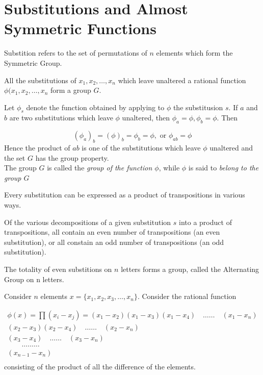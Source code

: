 \section{Substitutions and Almost Symmetric Functions}

Substition refers to the set of permutations of $n$ elements which form the Symmetric Group.

\begin{theorem}
All the substitutions of $x_1, x_2, \hdots, x_n$ which leave unaltered a rational function
$\phi(x_1, x_2,\hdots, x_n$ form a group $G$.
\end{theorem}

Let $\phi_s$ denote the function obtained by applying to $\phi$ the substitusion $s$. If $a$ and $b$
are two substitutions which leave $\phi$ unaltered, then $\phi_a = \phi, \phi_b = \phi$. Then

\[ (\phi_a)_b = (\phi)_b = \phi_b = \phi, \mbox{ or } \phi_{ab} = \phi \]
Hence the product of $ab$ is one of the substitutions which leave $\phi$ unaltered and the set
$G$ has the group property. \\

The group $G$ is called the {\it group of the function $\phi$}, while $\phi$ is said to {\it belong to the
group $G$}\\

\begin{theorem}
Every substitution can be expressed as a product of transpositions in various ways.
\end{theorem}

\begin{theorem}
Of the various decompositions of a given substitution $s$ into a product of transpositions, all contain
an even number of transpositions (an even substitution), or all constain an odd number of transpositions
(an odd substitution).
\end{theorem}

\begin{corollary}
The totality of even substitions on $n$ letters forms a group, called the Alternating Group on n letters.
\end{corollary}


Consider $n$ elements $x=\{ x_1, x_2, x_3, \hdots, x_n \}$. Consider the rational function

\[
\begin{array}{r}
\phi(x) = \prod(x_i - x_j) = (x_1-x_2) (x_1-x_3) (x_1-x_4) \quad \hdots\hdots\quad (x_1 - x_n) \\
(x_2-x_3) (x_2-x_4) \quad \hdots\hdots\quad (x_2 - x_n) \\
(x_3-x_4) \quad \hdots\hdots\quad (x_3 - x_n) \\
\quad\quad \hdots\hdots\hdots \quad\quad\quad~~\\
(x_{n-1} - x_n) \\
\end{array}
\]
consisting of the product of all the difference of the elements.\\

